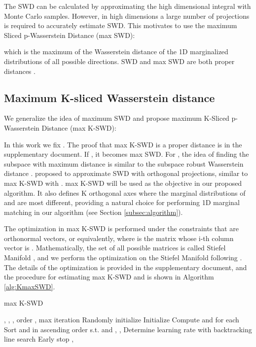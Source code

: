 \documentclass{article}
\begin{document}
The SWD can be calculated by approximating the high dimensional integral with Monte Carlo samples. However, in high dimensions a large number of projections is required to accurately estimate SWD. This motivates to use the maximum Sliced p-Wasserstein Distance (max SWD):

which is the maximum of the Wasserstein distance of the 1D marginalized distributions of all possible directions. SWD and max SWD are both proper distances \citep{kolouri2015radon, kolouri2019generalized}.

\subsection{Maximum K-sliced Wasserstein distance}

\label{subsec:max-K-SWD}

We generalize the idea of maximum SWD and propose maximum K-Sliced p-Wasserstein Distance (max K-SWD):

In this work we fix . The proof that max K-SWD is a proper distance is in the supplementary document.
If , it becomes max SWD. For , the idea of finding the subspace with maximum distance is similar to the subspace robust Wasserstein distance \citep{paty2019subspace}. \citet{wu2019sliced} proposed to approximate SWD with orthogonal projections, similar to max K-SWD with . max K-SWD will be used as the objective in our proposed algorithm. It also defines K orthogonal axes  where the marginal distributions of  and  are most different, providing a natural choice for performing 1D marginal matching in our algorithm (see Section \ref{subsec:algorithm}).

The optimization in max K-SWD is performed under the constraints that  are orthonormal vectors, or equivalently,  where  is the matrix whose i-th column vector is . Mathematically, the set of all possible  matrices is called Stiefel Manifold , and we perform the optimization on the Stiefel Manifold following \citet{tagare2011notes}. The details of the optimization is provided in the supplementary document, and the procedure for estimating max K-SWD and  is shown in Algorithm \ref{alg:KmaxSWD}.

\begin{algorithm}[tb]
   \caption{max K-SWD}
   \label{alg:KmaxSWD}
\begin{algorithmic}
    , , , order , max iteration 
   \STATE Randomly initialize 
   \STATE Initialize 
   \STATE  
   \STATE Compute  and  for each  
   \STATE Sort  and  in ascending order s.t.  and 
   \STATE 
   \ENDFOR
   \STATE ,  , 
   \STATE Determine learning rate  with backtracking line search  
   \STATE Early stop
   \ENDIF
   \ENDFOR
    , 
\end{algorithmic}
\end{algorithm}
\end{document}
